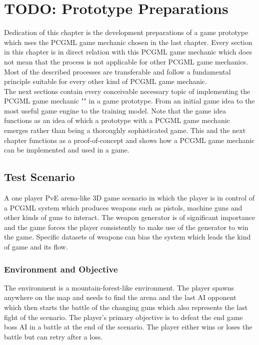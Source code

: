 \documentclass[MGS,Master,english]{twbook}%
\begin{document}
%
%
\clearpage
\chapter{TODO: Prototype Preparations} \label{chapter::gamePrototype}
Dedication of this chapter is the development preparations of a game prototype which uses the PCGML game mechanic chosen in the last chapter. Every section in this chapter is in direct relation with this PCGML game mechanic which does not mean that the process is not applicable for other PCGML game mechanics. Most of the described processes are transferable and follow a fundamental principle suitable for every other kind of PCGML game mechanic. \\
The next sections contain every conceivable necessary topic of implementing the PCGML game mechanic "" in a game prototype. From an initial game idea to the most useful game engine to the training model. Note that the game idea functions as an idea of which a prototype with a PCGML game mechanic emerges rather than being a thoroughly sophisticated game. This and the next chapter functions as a proof-of-concept and shows how a PCGML game mechanic can be implemented and used in a game.

\section{Test Scenario}
A one player \ac{PvE} arena-like 3D game scenario in which the player is in control of a PCGML system which produces weapons such as pistols, machine guns and other kinds of guns to interact. The weapon generator is of significant importance and the game forces the player consistently to make use of the generator to win the game. Specific datasets of weapons can bias the system which leads the kind of game and its flow. 

\subsection{Environment and Objective}
The environment is a mountain-forest-like environment. The player spawns anywhere on the map and needs to find the arena and the last AI opponent which then starts the battle of the changing guns which also represents the last fight of the scenario. The player's primary objective is to defeat the end game boss AI in a battle at the end of the scenario. The player either wins or loses the battle but can retry after a loss.
\end{document}
